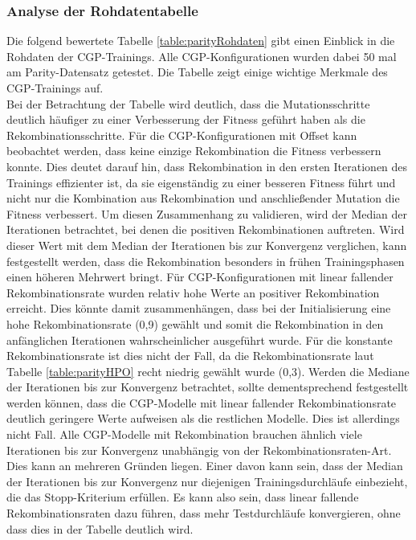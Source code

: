 \subsubsection{Analyse der Rohdatentabelle}
Die folgend bewertete Tabelle \ref{table:parityRohdaten} gibt einen Einblick in die Rohdaten der CGP-Trainings.
Alle CGP-Konfigurationen wurden dabei 50 mal am Parity-Datensatz getestet.
Die Tabelle zeigt einige wichtige Merkmale des CGP-Trainings auf.\\
Bei der Betrachtung der Tabelle wird deutlich, dass die Mutationsschritte deutlich häufiger zu einer Verbesserung der Fitness geführt haben als die Rekombinationsschritte.
Für die CGP-Konfigurationen mit Offset kann beobachtet werden, dass keine einzige Rekombination die Fitness verbessern konnte. 
Dies deutet darauf hin, dass Rekombination in den ersten Iterationen des Trainings effizienter ist, da sie eigenständig zu einer besseren Fitness führt und nicht nur die Kombination aus Rekombination und anschließender Mutation die Fitness verbessert.
Um diesen Zusammenhang zu validieren, wird der Median der Iterationen betrachtet, bei denen die positiven Rekombinationen auftreten.
Wird dieser Wert mit dem Median der Iterationen bis zur Konvergenz verglichen, kann festgestellt werden, dass die Rekombination besonders in frühen Trainingsphasen einen höheren Mehrwert bringt.
Für CGP-Konfigurationen mit linear fallender Rekombinationsrate wurden relativ hohe Werte an positiver Rekombination erreicht.
Dies könnte damit zusammenhängen, dass bei der Initialisierung eine hohe Rekombinationsrate (0,9) gewählt und somit die Rekombination in den anfänglichen Iterationen wahrscheinlicher ausgeführt wurde.
Für die konstante Rekombinationsrate ist dies nicht der Fall, da die Rekombinationsrate laut Tabelle \ref{table:parityHPO} recht niedrig gewählt wurde (0,3).
Werden die Mediane der Iterationen bis zur Konvergenz betrachtet, sollte dementsprechend festgestellt werden können, dass die CGP-Modelle mit linear fallender Rekombinationsrate deutlich geringere Werte aufweisen als die restlichen Modelle.
Dies ist allerdings nicht Fall.
Alle CGP-Modelle mit Rekombination brauchen ähnlich viele Iterationen bis zur Konvergenz unabhängig von der Rekombinationsraten-Art.
Dies kann an mehreren Gründen liegen.
Einer davon kann sein, dass der Median der Iterationen bis zur Konvergenz nur diejenigen Trainingsdurchläufe einbezieht, die das Stopp-Kriterium erfüllen. 
Es kann also sein, dass linear fallende Rekombinationsraten dazu führen, dass mehr Testdurchläufe konvergieren, ohne dass dies in der Tabelle deutlich wird.
